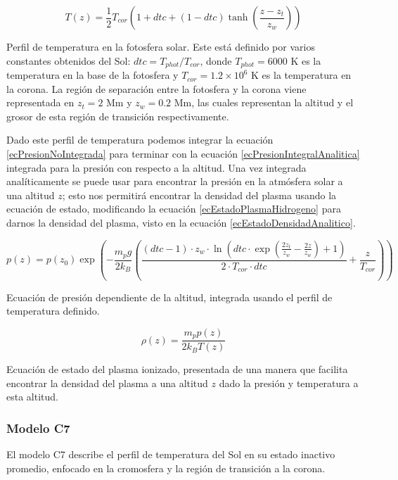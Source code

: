 \begin{equ}[!ht]
	\begin{equation} \label{ecTemperaturaAnalitica}
		T(z) = \frac{1}{2} T_{cor} \left(1 + dtc + \left(1 - dtc\right) \tanh \left(\frac{z - z_t}{z_w}\right)\right)
	\end{equation}
	\caption{Perfil de temperatura en la fotosfera solar. Este está definido por
	varios constantes obtenidos del Sol: \(dtc = T_{phot} / T_{cor}\), donde
	\(T_{phot} = 6000 \textrm{ K}\) es la temperatura en la base de la fotosfera
	y \(T_{cor} = 1.2 \times 10^6 \textrm{ K}\) es la temperatura en la corona.
	La región de separación entre la fotosfera y la corona viene representada en
	\(z_t = 2 \textrm{ Mm}\) y \(z_w = 0.2 \textrm{ Mm}\), las cuales
	representan la altitud y el grosor de esta región de transición
	respectivamente. \cite{newtonianCafe}} 
\end{equ}

Dado este perfil de temperatura podemos integrar la ecuación
\ref{ecPresionNoIntegrada} para terminar con la ecuación
\ref{ecPresionIntegralAnalitica} integrada para la presión con respecto a la
altitud. Una vez integrada analíticamente se puede usar para encontrar la
presión en la atmósfera solar a una altitud \(z\); esto nos permitirá encontrar
la densidad del plasma usando la ecuación de estado, modificando la ecuación
\ref{ecEstadoPlasmaHidrogeno} para darnos la densidad del plasma, visto en la
ecuación \ref{ecEstadoDensidadAnalitico}.

\begin{equ}[!ht]
	\begin{equation} \label{ecPresionIntegralAnalitica}
		p(z) = p(z_0) \exp \left(
			- \frac{m_p g}{2 k_B} 
			\left(
				\frac{
					\left(dtc - 1\right) \cdot z_w \cdot
					\ln \left(
						dtc \cdot 
						\exp \left(
							\frac{2 z_t}{z_w} - \frac{2 z}{z_w}
						\right) + 1
					\right) 
				}{
					2 \cdot T_{cor} \cdot dtc
				}
				+ \frac{z}{T_{cor}}
			\right)
		\right)
	\end{equation}
	\caption{Ecuación de presión dependiente de la altitud, integrada usando el perfil de temperatura definido.}
\end{equ}

\begin{equ}[!ht]
	\begin{equation} \label{ecEstadoDensidadAnalitico}
		\rho (z) = \frac{m_p p(z)}{2 k_B T(z)}
	\end{equation}
	\caption{Ecuación de estado del plasma ionizado, presentada de una manera
	que facilita encontrar la densidad del plasma a una altitud \(z\) dado la
	presión y temperatura a esta altitud. \cite{newtonianCafe}}
\end{equ}

\subsubsection*{Modelo C7}
El modelo C7 describe el perfil de temperatura del Sol en su estado inactivo
promedio, enfocado en la cromosfera y la región de transición a la corona.
\cite{c7ModelPaper} 